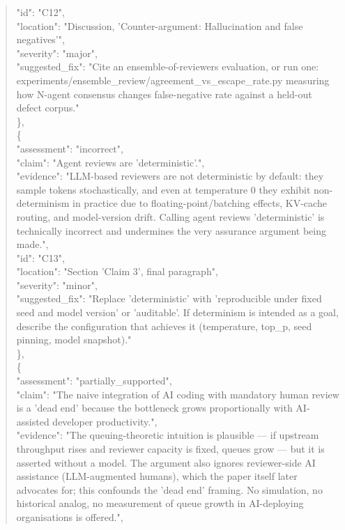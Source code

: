 \documentclass[11pt]{article}
\begin{document}
\begin{quote}
      "id": "C12",\\
      "location": "Discussion, 'Counter-argument: Hallucination and false negatives'",\\
      "severity": "major",\\
      "suggested\_fix": "Cite an ensemble-of-reviewers evaluation, or run one: experiments/ensemble\_review/agreement\_vs\_escape\_rate.py measuring how N-agent consensus changes false-negative rate against a held-out defect corpus."\\
    \},\\
    \{\\
      "assessment": "incorrect",\\
      "claim": "Agent reviews are 'deterministic'.",\\
      "evidence": "LLM-based reviewers are not deterministic by default: they sample tokens stochastically, and even at temperature 0 they exhibit non-determinism in practice due to floating-point/batching effects, KV-cache routing, and model-version drift. Calling agent reviews 'deterministic' is technically incorrect and undermines the very assurance argument being made.",\\
      "id": "C13",\\
      "location": "Section 'Claim 3', final paragraph",\\
      "severity": "minor",\\
      "suggested\_fix": "Replace 'deterministic' with 'reproducible under fixed seed and model version' or 'auditable'. If determinism is intended as a goal, describe the configuration that achieves it (temperature, top\_p, seed pinning, model snapshot)."\\
    \},\\
    \{\\
      "assessment": "partially\_supported",\\
      "claim": "The naive integration of AI coding with mandatory human review is a 'dead end' because the bottleneck grows proportionally with AI-assisted developer productivity.",\\
      "evidence": "The queuing-theoretic intuition is plausible --- if upstream throughput rises and reviewer capacity is fixed, queues grow --- but it is asserted without a model. The argument also ignores reviewer-side AI assistance (LLM-augmented humans), which the paper itself later advocates for; this confounds the 'dead end' framing. No simulation, no historical analog, no measurement of queue growth in AI-deploying organisations is offered.",\\

\end{quote}
\end{document}
